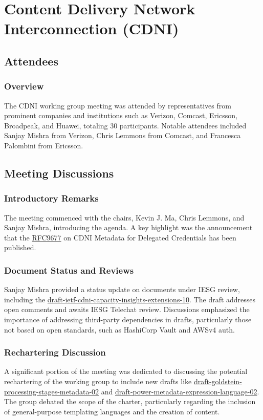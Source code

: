 \documentclass{article}
\begin{document}
\newpage

\section{Content Delivery Network Interconnection (CDNI)}

\subsection{Attendees}
\subsubsection{Overview}
The CDNI working group meeting was attended by representatives from prominent companies and institutions such as Verizon, Comcast, Ericsson, Broadpeak, and Huawei, totaling 30 participants. Notable attendees included Sanjay Mishra from Verizon, Chris Lemmons from Comcast, and Francesca Palombini from Ericsson.

\subsection{Meeting Discussions}

\subsubsection{Introductory Remarks}
The meeting commenced with the chairs, Kevin J. Ma, Chris Lemmons, and Sanjay Mishra, introducing the agenda. A key highlight was the announcement that the \href{https://datatracker.ietf.org/doc/html/rfc9677}{RFC9677} on CDNI Metadata for Delegated Credentials has been published.

\subsubsection{Document Status and Reviews}
Sanjay Mishra provided a status update on documents under IESG review, including the \href{https://datatracker.ietf.org/doc/html/draft-ietf-cdni-capacity-insights-extensions-10}{draft-ietf-cdni-capacity-insights-extensions-10}. The draft addresses open comments and awaits IESG Telechat review. Discussions emphasized the importance of addressing third-party dependencies in drafts, particularly those not based on open standards, such as HashiCorp Vault and AWSv4 auth.

\subsubsection{Rechartering Discussion}
A significant portion of the meeting was dedicated to discussing the potential rechartering of the working group to include new drafts like \href{https://datatracker.ietf.org/doc/html/draft-goldstein-processing-stages-metadata-02}{draft-goldstein-processing-stages-metadata-02} and \href{https://datatracker.ietf.org/doc/html/draft-power-metadata-expression-language-02}{draft-power-metadata-expression-language-02}. The group debated the scope of the charter, particularly regarding the inclusion of general-purpose templating languages and the creation of content.
\end{document}
